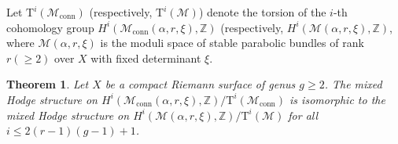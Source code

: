 \documentclass[11pt, reqno]{amsart}
\numberwithin{equation}{section}
\newtheorem{theorem}{Theorem}[section]
\theoremstyle{definition}
\begin{document}
Let $\mathrm{T}^i(\mathcal{M}_{\mathrm{conn}})$ (respectively, $\mathrm{T}^i(\mathcal{M})$) denote the torsion of the $i$-th cohomology group $H^i(\mathcal{M}_{\mathrm{conn}}(\alpha, r, \xi),\mathbb{Z})$ (respectively, $H^i(\mathcal{M}(\alpha, r, \xi),\mathbb{Z})$,  where $\mathcal{M}(\alpha, r, \xi)$ is the moduli space of stable parabolic bundles of rank $r (\geq 2)$ over $X$ with fixed determinant $\xi$.
\begin{theorem}\label{mhstheorem}
Let $X$ be a compact Riemann surface of genus $g \geq 2$. The mixed Hodge structure on $H^i(\mathcal{M}_{\mathrm{conn}}(\alpha, r, \xi),\mathbb{Z})/\mathrm{T}^i(\mathcal{M}_{\mathrm{conn}})$ is isomorphic to the mixed Hodge structure on $H^i(\mathcal{M}(\alpha, r, \xi),\mathbb{Z})/\mathrm{T}^i(\mathcal{M})$ for all $i \leq 2(r-1)(g-1) + 1$.

\end{theorem}
\end{document}
